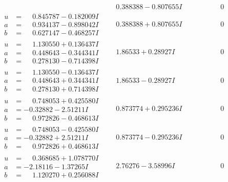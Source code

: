 \documentclass[1p]{elsarticle_modified}
\theoremstyle{definition}
\begin{document}
$$\begin{array}{c|c|c}
 & \phantom{-}0.388388 - 0.807655 I & \phantom{-0.000000 } 0 \\ \hline\begin{aligned}
u &= \phantom{-}0.845787 - 0.182009 I \\
a &= \phantom{-}0.934137 - 0.898042 I \\
b &= \phantom{-}0.627147 - 0.468257 I\end{aligned}
 & \phantom{-}0.388388 + 0.807655 I & \phantom{-0.000000 } 0 \\ \hline\begin{aligned}
u &= \phantom{-}1.130550 + 0.136437 I \\
a &= \phantom{-}0.448643 - 0.344341 I \\
b &= \phantom{-}0.278130 - 0.714398 I\end{aligned}
 & \phantom{-}1.86533 + 0.28927 I & \phantom{-0.000000 } 0 \\ \hline\begin{aligned}
u &= \phantom{-}1.130550 - 0.136437 I \\
a &= \phantom{-}0.448643 + 0.344341 I \\
b &= \phantom{-}0.278130 + 0.714398 I\end{aligned}
 & \phantom{-}1.86533 - 0.28927 I & \phantom{-0.000000 } 0 \\ \hline\begin{aligned}
u &= \phantom{-}0.748053 + 0.425580 I \\
a &= -0.32882 - 2.51211 I \\
b &= \phantom{-}0.972826 - 0.468613 I\end{aligned}
 & \phantom{-}0.873774 + 0.295236 I & \phantom{-0.000000 } 0 \\ \hline\begin{aligned}
u &= \phantom{-}0.748053 - 0.425580 I \\
a &= -0.32882 + 2.51211 I \\
b &= \phantom{-}0.972826 + 0.468613 I\end{aligned}
 & \phantom{-}0.873774 - 0.295236 I & \phantom{-0.000000 } 0 \\ \hline\begin{aligned}
u &= \phantom{-}0.368685 + 1.078770 I \\
a &= -2.18116 - 1.37265 I \\
b &= \phantom{-}1.120270 + 0.256088 I\end{aligned}
 & \phantom{-}2.76276 - 3.58996 I & \phantom{-0.000000 } 0 \\ \hline\begin{aligned}

\end{aligned}
\end{array}$$
\end{document}
